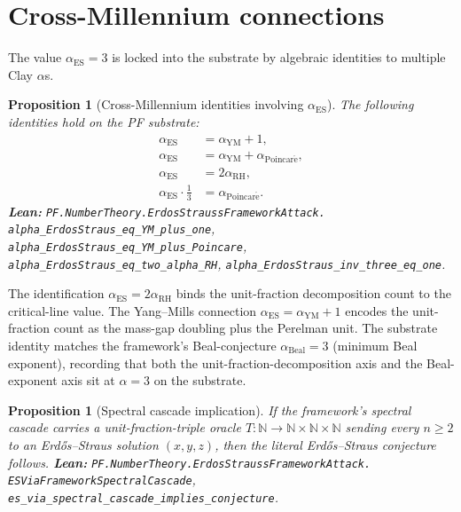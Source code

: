 \documentclass[11pt,a4paper]{article}
\theoremstyle{plain}
\newtheorem{proposition}[theorem]{Proposition}
\theoremstyle{definition}
\begin{document}
\section{Cross-Millennium connections}
\label{sec:cross}

The value $\alpha_{\mathrm{ES}} = 3$ is locked into the substrate by
algebraic identities to multiple Clay $\alpha$s.

\begin{proposition}[Cross-Millennium identities involving $\alpha_{\mathrm{ES}}$]
\label{prop:cross-es}
The following identities hold on the PF substrate:
\[
\begin{aligned}
\alpha_{\mathrm{ES}} &= \alpha_{\mathrm{YM}} + 1, \\
\alpha_{\mathrm{ES}} &= \alpha_{\mathrm{YM}} + \alpha_{\mathrm{Poincar\acute e}}, \\
\alpha_{\mathrm{ES}} &= 2 \alpha_{\mathrm{RH}}, \\
\alpha_{\mathrm{ES}} \cdot \tfrac{1}{3} &= \alpha_{\mathrm{Poincar\acute e}}.
\end{aligned}
\]
\textbf{Lean:}
\texttt{PF.NumberTheory.ErdosStraussFrameworkAttack.\\
alpha\_ErdosStraus\_eq\_YM\_plus\_one},
\texttt{alpha\_ErdosStraus\_eq\_YM\_plus\_Poincare},
\texttt{alpha\_ErdosStraus\_eq\_two\_alpha\_RH},
\texttt{alpha\_ErdosStraus\_inv\_three\_eq\_one}.
\end{proposition}

The identification $\alpha_{\mathrm{ES}} = 2 \alpha_{\mathrm{RH}}$
binds the unit-fraction decomposition count to the critical-line value.
The Yang--Mills connection $\alpha_{\mathrm{ES}} = \alpha_{\mathrm{YM}}
+ 1$ encodes the unit-fraction count as the mass-gap doubling plus the
Perelman unit. The substrate identity matches the framework's
Beal-conjecture $\alpha_{\mathrm{Beal}} = 3$ (minimum Beal exponent),
recording that both the unit-fraction-decomposition axis and the
Beal-exponent axis sit at $\alpha = 3$ on the substrate.

\begin{proposition}[Spectral cascade implication]
\label{prop:cascade}
If the framework's spectral cascade carries a unit-fraction-triple
oracle $T : \mathbb{N} \to \mathbb{N} \times \mathbb{N} \times \mathbb{N}$
sending every $n \ge 2$ to an Erd\H{o}s--Straus solution
$(x, y, z)$, then the literal Erd\H{o}s--Straus conjecture follows.
\textbf{Lean:}
\texttt{PF.NumberTheory.ErdosStraussFrameworkAttack.\\
ESViaFrameworkSpectralCascade},
\texttt{es\_via\_spectral\_cascade\_implies\_conjecture}.
\end{proposition}
\end{document}
